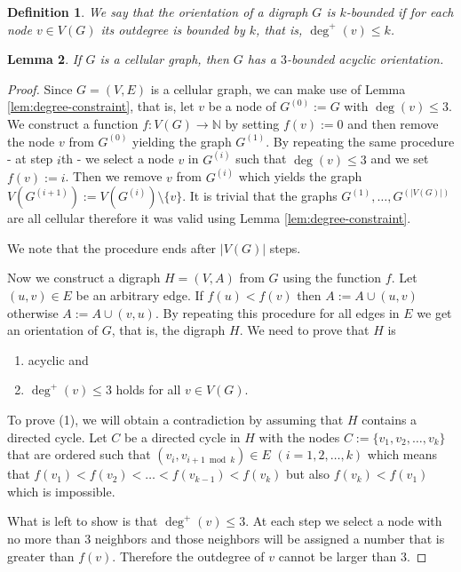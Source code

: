 \documentclass[a4paper, 12pt]{article}
\newtheorem{lem}{Lemma}[section]
\newtheorem{defin}[lem]{Definition}
\begin{document}
\begin{defin}
We say that the orientation of a digraph $G$ is $k$\textit{-bounded} if for each node $v \in V(G)$ its outdegree is bounded by $k$, that is, $\deg^+(v) \leqslant k$.
\end{defin}
\begin{lem}\label{lem:bounded-acyclic-orientation}
If $G$ is a cellular graph, then $G$ has a $3$-bounded acyclic orientation.
\end{lem}
\begin{proof} Since $G=(V,E)$ is a cellular graph, we can make use of Lemma \ref{lem:degree-constraint}, that is, let $v$ be a node of $G^{(0)}:=G$ with $\deg(v) \leqslant 3$. We construct a function $f\colon V(G) \to \mathbb{N}$ by setting $f(v) := 0$ and then remove the node $v$ from $G^{(0)}$ yielding the graph $G^{(1)}$. By repeating the same procedure - at step $i$th - we select a node $v$ in $G^{(i)}$ such that $\deg(v) \leqslant 3$ and we set $f(v):=i$. Then we remove $v$ from $G^{(i)}$ which yields the graph $V(G^{(i+1)}) := V(G^{(i)}) \setminus \lbrace v \rbrace$. It is trivial that the graphs $G^{(1)},\ldots,G^{(|V(G)|)}$ are all cellular therefore it was valid using Lemma \ref{lem:degree-constraint}.

We note that the procedure ends after $|V(G)|$ steps.

Now we construct a digraph $H=(V,A)$ from $G$ using the function $f$. Let $(u,v) \in E$ be an arbitrary edge. If $f(u) < f(v)$ then $A:=A\cup (u,v)$ otherwise $A:=A \cup (v,u)$. By repeating this procedure for all edges in $E$ we get an orientation of $G$, that is, the digraph $H$. We need to prove that $H$ is
\begin{enumerate}
\item acyclic and
\item $\deg^+(v) \leqslant 3$ holds for all $v \in V(G)$.
\end{enumerate}
To prove (1), we will obtain a contradiction by assuming that $H$ contains a directed cycle. Let $C$ be a directed cycle in $H$ with the nodes $C:=\lbrace v_1,v_2,\ldots,v_k \rbrace$ that are ordered such that $(v_i,v_{i+1 \bmod{k}}) \in E$ $(i=1,2,\ldots,k)$ which means that $f(v_1) < f(v_2) < \ldots < f(v_{k-1}) < f(v_k)$ but also $f(v_k) < f(v_1)$ which is impossible.

What is left to show is that $\deg^+(v) \leqslant 3$. At each step we select a node with no more than $3$ neighbors and those neighbors will be assigned a number that is greater than $f(v)$. Therefore the outdegree of $v$ cannot be larger than $3$.
\end{proof}
\end{document}
